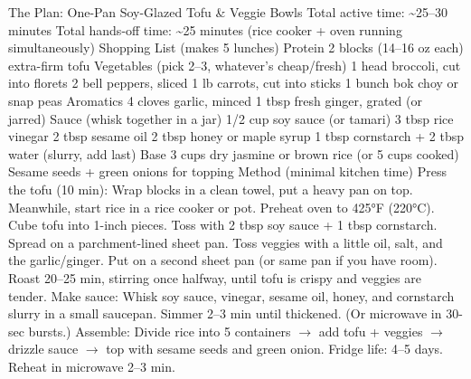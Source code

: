 The Plan: One-Pan Soy-Glazed Tofu \& Veggie Bowls Total active time: \~{}25–30 minutes Total hands-off time: \~{}25 minutes (rice cooker + oven running simultaneously) Shopping List (makes 5 lunches) Protein 2 blocks (14–16 oz each) extra-firm tofu Vegetables (pick 2–3, whatever's cheap/fresh) 1 head broccoli, cut into florets 2 bell peppers, sliced 1 lb carrots, cut into sticks 1 bunch bok choy or snap peas Aromatics 4 cloves garlic, minced 1 tbsp fresh ginger, grated (or jarred) Sauce (whisk together in a jar) 1/2 cup soy sauce (or tamari) 3 tbsp rice vinegar 2 tbsp sesame oil 2 tbsp honey or maple syrup 1 tbsp cornstarch + 2 tbsp water (slurry, add last) Base 3 cups dry jasmine or brown rice (or 5 cups cooked) Sesame seeds + green onions for topping Method (minimal kitchen time) Press the tofu (10 min): Wrap blocks in a clean towel, put a heavy pan on top. Meanwhile, start rice in a rice cooker or pot. Preheat oven to 425°F (220°C). Cube tofu into 1-inch pieces. Toss with 2 tbsp soy sauce + 1 tbsp cornstarch. Spread on a parchment-lined sheet pan. Toss veggies with a little oil, salt, and the garlic/ginger. Put on a second sheet pan (or same pan if you have room). Roast 20–25 min, stirring once halfway, until tofu is crispy and veggies are tender. Make sauce: Whisk soy sauce, vinegar, sesame oil, honey, and cornstarch slurry in a small saucepan. Simmer 2–3 min until thickened. (Or microwave in 30-sec bursts.) Assemble: Divide rice into 5 containers $\rightarrow$ add tofu + veggies $\rightarrow$ drizzle sauce $\rightarrow$ top with sesame seeds and green onion. Fridge life: 4–5 days. Reheat in microwave 2–3 min.
\par

